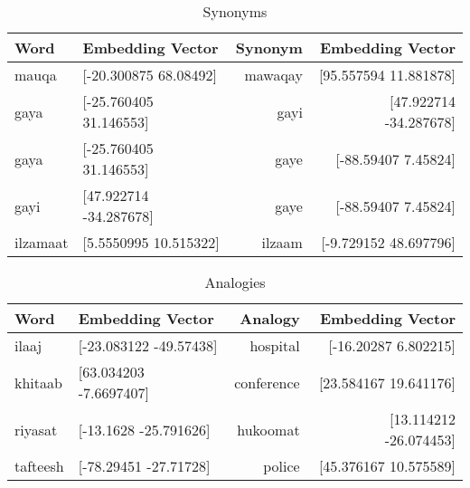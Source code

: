 \documentclass{exam}
\begin{document}
\begin{table}[h!]
  			\begin{center}
    			\caption{Synonyms}
    			\begin{tabular}{l|l|r|r}
      				\textbf{Word} & \textbf{Embedding Vector} & \textbf{Synonym} & \textbf{Embedding Vector}\\
      				\hline
      				mauqa & [-20.300875  68.08492] & mawaqay & [95.557594 11.881878]
\\
      				gaya & [-25.760405  31.146553] & gayi & [47.922714 -34.287678]\\
      				gaya & [-25.760405  31.146553] & gaye & [-88.59407   7.45824]\\
      				gayi & [47.922714 -34.287678] & gaye & [-88.59407   7.45824]\\
      				ilzamaat & [5.5550995 10.515322] & ilzaam & [-9.729152 48.697796]\\
    			\end{tabular}
  			\end{center}
\end{table}

\begin{table}[h!]
  			\begin{center}
    			\caption{Analogies}
    			\begin{tabular}{l|l|r|r}
      				\textbf{Word} & \textbf{Embedding Vector} & \textbf{Analogy} & \textbf{Embedding Vector}\\
      				\hline
      				ilaaj & [-23.083122 -49.57438] & hospital & [-16.20287    6.802215]\\
      				khitaab & [63.034203  -7.6697407] & conference & [23.584167 19.641176]\\
      				riyasat & [-13.1628   -25.791626] & hukoomat & [13.114212 -26.074453]\\
      				tafteesh & [-78.29451 -27.71728] & police & [45.376167 10.575589]\\
    			\end{tabular}
  			\end{center}
\end{table}
\end{document}
